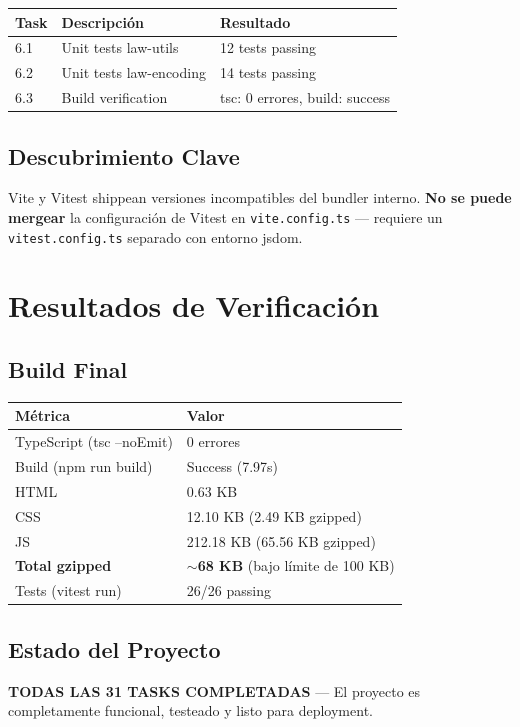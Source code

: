 \documentclass[11pt,a4paper]{report}
\begin{document}
\begin{table}[h]
\centering
\small
\begin{tabular}{@{}lll@{}}
\toprule
\textbf{Task} & \textbf{Descripción} & \textbf{Resultado} \\
\midrule
6.1 & Unit tests law-utils & 12 tests passing \\
6.2 & Unit tests law-encoding & 14 tests passing \\
6.3 & Build verification & tsc: 0 errores, build: success \\
\bottomrule
\end{tabular}
\end{table}

\section{Descubrimiento Clave}

Vite y Vitest shippean versiones incompatibles del bundler interno. \textbf{No se puede mergear} la configuración de Vitest en \texttt{vite.config.ts} — requiere un \texttt{vitest.config.ts} separado con entorno jsdom.

\cleardoublepage

\chapter{Resultados de Verificación}

\section{Build Final}

\begin{table}[h]
\centering
\begin{tabular}{@{}ll@{}}
\toprule
\textbf{Métrica} & \textbf{Valor} \\
\midrule
TypeScript (tsc --noEmit) & 0 errores \\
Build (npm run build) & Success (7.97s) \\
HTML & 0.63 KB \\
CSS & 12.10 KB (2.49 KB gzipped) \\
JS & 212.18 KB (65.56 KB gzipped) \\
\textbf{Total gzipped} & \textbf{$\sim$68 KB} (bajo límite de 100 KB) \\
Tests (vitest run) & 26/26 passing \\
\bottomrule
\end{tabular}
\end{table}

\section{Estado del Proyecto}

\textbf{TODAS LAS 31 TASKS COMPLETADAS} — El proyecto es completamente funcional, testeado y listo para deployment.
\end{document}
